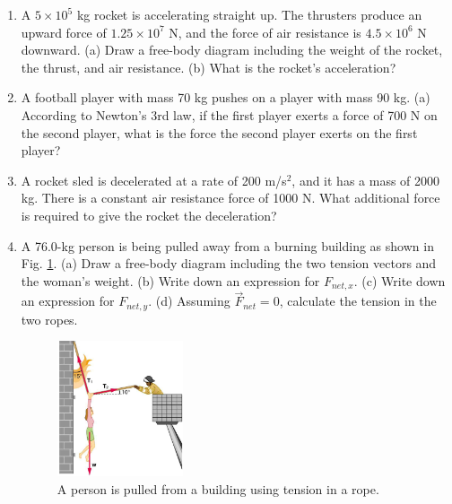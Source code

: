 \documentclass[10pt]{article}
\begin{document}
\begin{enumerate}
\item A $5\times 10^5$ kg rocket is accelerating straight up.  The thrusters produce an upward force of $1.25 \times 10^7$ N, and the force of air resistance is $4.5 \times 10^6$ N downward.  (a) Draw a free-body diagram including the weight of the rocket, the thrust, and air resistance.  (b) What is the rocket’s acceleration? \\ \vspace{2cm}
\item A football player with mass 70 kg pushes on a player with mass 90 kg.  (a) According to Newton's 3rd law, if the first player exerts a force of 700 N on the second player, what is the force the second player exerts on the first player? \\ \vspace{1cm}
\item A rocket sled is decelerated at a rate of 200 m/s$^2$, and it has a mass of 2000 kg.  There is a constant air resistance force of 1000 N.  What additional force is required to give the rocket the deceleration?  \\ \vspace{2cm}
\item A 76.0-kg person is being pulled away from a burning building as shown in Fig. \ref{fig:fire}.  (a) Draw a free-body diagram including the two tension vectors and the woman's weight.  (b) Write down an expression for $F_{net,x}$.  (c) Write down an expression for $F_{net,y}$.  (d) Assuming $\vec{F}_{net} = 0$, calculate the tension in the two ropes. \\ \vspace{2.5cm}
\begin{figure}[hb]
\centering
\includegraphics[width=0.35\textwidth]{fire.png}
\caption{\label{fig:fire} A person is pulled from a building using tension in a rope.}
\end{figure}
\end{enumerate}
\end{document}
